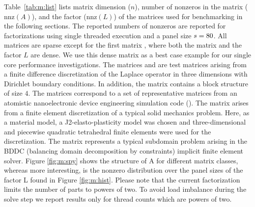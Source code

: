 Table~\ref{tab:m:list} lists matrix dimension ($n$), number of nonzeros in the
matrix ($\text{nnz}(A)$), and the factor (nnz$(L)$) of the matrices used for
benchmarking in the following sections.
The reported numbers of nonzeros
are reported for factorizations using single threaded execution
and a panel size $s = 80$.
All matrices are sparse except
for the first matrix , where both the matrix and
the factor $L$ are dense.
We use this dense matrix as a best case example for our single core performance
investigations.
The matrices  and  are test matrices arising from a
finite difference discretization of the Laplace operator in three dimensions
with Dirichlet boundary conditions.
In addition, the matrix  contains a block structure
of size $4$.
The  matrices correspond to a set of representative matrices from
an atomistic nanoelectronic device engineering simulation code (\cite{luisier2011atomistic}).
The matrix  arises from a finite element discretization of a typical
solid mechanics problem. Here, as a material model, a J2-elasto-plasticity model
was chosen and three-dimensional and piecewise quadratic tetrahedral finite
elements were used for the discretization. The matrix  represents a
typical subdomain problem arising in the BDDC (balancing domain decomposition by
constraints) implicit finite element solver.
Figure \ref{fig:m:spy} shows the structure of A for different matrix classes, whereas more interesting, is the nonzero distribution over the panel sizes of the factor L found in Figure \ref{fig:m:hist}.
Please note that the current factorization limits the number of parts to powers
of two.
To avoid load imbalance during the solve step we report results only for thread
counts which are powers of two.

